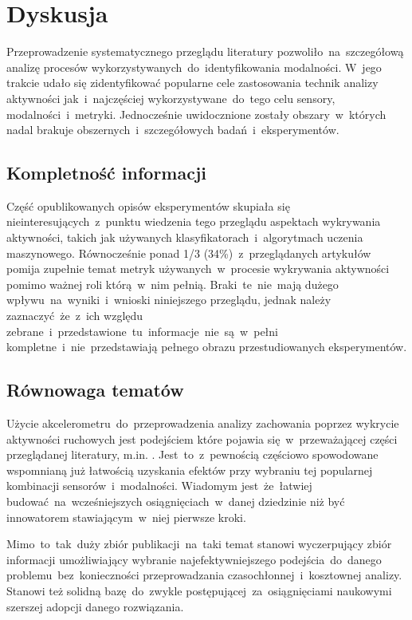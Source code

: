 \pagebreak
\section{Dyskusja}
Przeprowadzenie systematycznego przeglądu literatury pozwoliło~na~szczegółową analizę procesów wykorzystywanych~do~identyfikowania modalności. W~jego trakcie udało się zidentyfikować popularne cele zastosowania technik analizy aktywności jak~i~najczęściej wykorzystywane~do~tego celu sensory, modalności~i~metryki. Jednocześnie uwidocznione zostały obszary~w~których nadal brakuje obszernych~i~szczegółowych badań~i~eksperymentów.

\subsection{Kompletność informacji}
Część opublikowanych opisów eksperymentów skupiała się nieinteresujących~z~punktu wiedzenia tego przeglądu aspektach wykrywania aktywności, takich jak używanych klasyfikatorach~i~algorytmach uczenia maszynowego. Równocześnie ponad 1/3 (34\%)~z~przeglądanych artykułów pomija zupełnie temat metryk używanych~w~procesie wykrywania aktywności pomimo ważnej roli którą~w~nim pełnią. Braki~te~nie~mają dużego wpływu~na~wyniki~i~wnioski niniejszego przeglądu, jednak należy zaznaczyć~że~z~ich względu zebrane~i~przedstawione~tu~informacje~nie~są~w~pełni kompletne~i~nie~przedstawiają pełnego obrazu przestudiowanych eksperymentów. 

\subsection{Równowaga tematów}
\label{sec:article_balance}
Użycie akcelerometru~do~przeprowadzenia analizy zachowania poprzez wykrycie aktywności ruchowych jest podejściem które pojawia się~w~przeważającej części przeglądanej literatury, m.in. \cite{S59, S33, S29, S30, S32, S42}. Jest~to~z~pewnością częściowo spowodowane wspomnianą już łatwością uzyskania efektów przy wybraniu tej popularnej kombinacji sensorów~i~modalności. Wiadomym jest~że~łatwiej budować~na~wcześniejszych osiągnięciach~w~danej dziedzinie niż być innowatorem stawiającym~w~niej pierwsze kroki. 

Mimo~to~tak~duży zbiór publikacji~na~taki temat stanowi wyczerpujący zbiór informacji umożliwiający wybranie najefektywniejszego podejścia~do~danego problemu~bez~konieczności przeprowadzania czasochłonnej~i~kosztownej analizy. Stanowi też solidną bazę~do~zwykle postępującej~za~osiągnięciami naukowymi szerszej adopcji danego rozwiązania.

